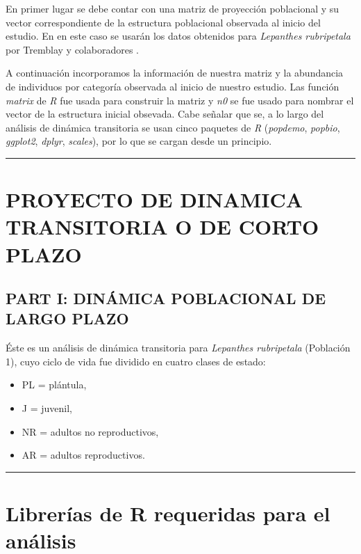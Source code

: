 \documentclass[
]{book}
\providecommand{\tightlist}{%
  \setlength{\itemsep}{0pt}\setlength{\parskip}{0pt}}
\theoremstyle{definition}
\theoremstyle{definition}
\theoremstyle{definition}
\theoremstyle{definition}
\theoremstyle{remark}
\begin{document}
En primer lugar se debe contar con una matriz de proyección poblacional y su vector correspondiente de la estructura poblacional observada al inicio del estudio. En en este caso se usarán los datos obtenidos para \emph{Lepanthes rubripetala} por Tremblay y colaboradores \citep{tremblay2015stable, schodelbauerova2010prediction}.

A continuación incorporamos la información de nuestra matriz y la abundancia de individuos por categoría observada al inicio de nuestro estudio. Las función \emph{matrix} de \emph{R} fue usada para construir la matriz y \emph{n0} se fue usado para nombrar el vector de la estructura inicial obsevada. Cabe señalar que se, a lo largo del análisis de dinámica transitoria se usan cinco paquetes de \emph{R} (\emph{popdemo}, \emph{popbio}, \emph{ggplot2}, \emph{dplyr}, \emph{scales}), por lo que se cargan desde un principio.

\begin{center}\rule{0.5\linewidth}{0.5pt}\end{center}

\section{PROYECTO DE DINAMICA TRANSITORIA O DE CORTO PLAZO}\label{proyecto-de-dinamica-transitoria-o-de-corto-plazo}

\subsection{PART I: DINÁMICA POBLACIONAL DE LARGO PLAZO}\label{part-i-dinuxe1mica-poblacional-de-largo-plazo}

Éste es un análisis de dinámica transitoria para \emph{Lepanthes rubripetala} (Población 1), cuyo ciclo de vida fue dividido en cuatro clases de estado:

\begin{itemize}
\tightlist
\item
  PL = plántula,
\item
  J = juvenil,
\item
  NR = adultos no reproductivos,
\item
  AR = adultos reproductivos.
\end{itemize}

\begin{center}\rule{0.5\linewidth}{0.5pt}\end{center}

\section{Librerías de R requeridas para el análisis}\label{libreruxedas-de-r-requeridas-para-el-anuxe1lisis-2}
\end{document}
